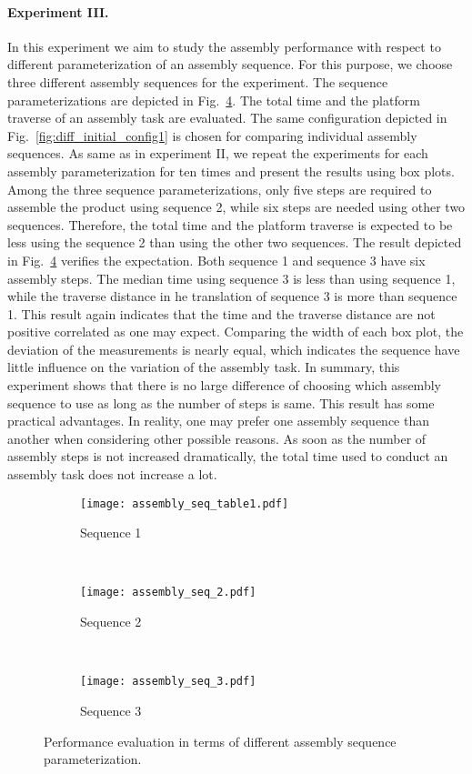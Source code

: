 \paragraph{Experiment III.} In this experiment we aim to study the assembly performance with respect to different parameterization of an assembly sequence. For this purpose, we choose three different assembly sequences for the experiment. The sequence parameterizations are depicted in Fig.~\ref{fig:assembly_seq}. The total time and the platform traverse of an assembly task are evaluated. The same configuration depicted in Fig.~\ref{fig:diff_initial_config1} is chosen for comparing individual assembly sequences. As same as in experiment II, we repeat the experiments for each assembly parameterization for ten times and present the results using box plots. Among the three sequence parameterizations, only five steps are required to assemble the product using sequence 2, while six steps are needed using other two sequences. Therefore, the total time and the platform traverse is expected to be less using the sequence 2 than using the other two sequences. The result depicted in Fig.~\ref{fig:assembly_seq} verifies the expectation.  Both sequence 1 and sequence 3 have six assembly steps. The median time using sequence 3 is less than using sequence 1, while the traverse distance in he translation of sequence 3 is more than sequence 1. This result again indicates that the time and the traverse distance are not positive correlated as one may expect. Comparing the width of each box plot, the deviation of the measurements is nearly equal, which indicates the sequence have little influence on the variation of the assembly task. In summary, this experiment shows that there is no large difference of choosing which assembly sequence to use as long as the number of steps is same. This  result has some practical advantages. In reality, one may prefer one assembly sequence than another when considering other possible reasons. As soon as the number of assembly steps is not increased dramatically, the total time used to conduct an assembly task does not increase a lot. 

 
\begin{figure}[!htbp]
\captionsetup[subfigure]{position=b}
    \centering
    \begin{subfigure}[t]{0.4\textwidth}
        \texttt{[image: assembly\_seq\_table1.pdf]}
        \caption{Sequence 1}
        \label{fig:assembly_seq_3a}
    \end{subfigure}
    ~
    \begin{subfigure}[t]{0.4\textwidth}
        \texttt{[image: assembly\_seq\_2.pdf]}
        \caption{Sequence 2}
        \label{fig:assembly_seq_3b}
    \end{subfigure}
    ~
    \begin{subfigure}[t]{0.4\textwidth}
        \texttt{[image: assembly\_seq\_3.pdf]}
        \caption{Sequence 3}
        \label{fig:assembly_seq_3c}
    \end{subfigure}
    \caption{Performance evaluation in terms of different assembly sequence parameterization.}\label{fig:assembly_seq}
\end{figure}

